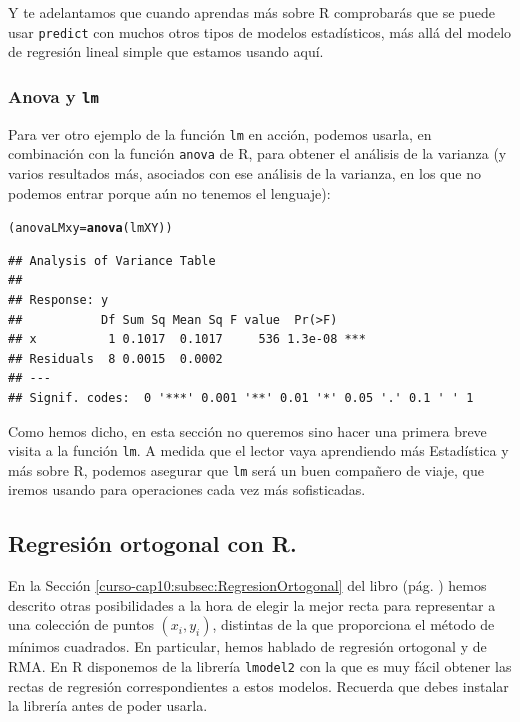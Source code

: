 \documentclass[10pt,a4paper]{article}\usepackage[]{graphicx}\usepackage[]{color}
\makeatletter
\newcommand{\hlstd}[1]{\textcolor[rgb]{0.345,0.345,0.345}{#1}}%
\newcommand{\hlkwb}[1]{\textcolor[rgb]{0.69,0.353,0.396}{#1}}%
\newcommand{\hlkwd}[1]{\textcolor[rgb]{0.737,0.353,0.396}{\textbf{#1}}}%
\newenvironment{kframe}{%
 \def\at@end@of@kframe{}%
 \ifinner\ifhmode%
  \def\at@end@of@kframe{\end{minipage}}%
  \begin{minipage}{\columnwidth}%
 \fi\fi%
 \def\FrameCommand##1{\hskip\@totalleftmargin \hskip-\fboxsep
 \colorbox{shadecolor}{##1}\hskip-\fboxsep
     \hskip-\linewidth \hskip-\@totalleftmargin \hskip\columnwidth}%
 \MakeFramed {\advance\hsize-\width
   \@totalleftmargin\z@ \linewidth\hsize
   \@setminipage}}%
 {\par\unskip\endMakeFramed%
 \at@end@of@kframe}
\newenvironment{knitrout}{}{} %
\makeatother
\begin{document}
Y te adelantamos que cuando aprendas más sobre R comprobarás que se puede usar {\tt predict} con muchos otros tipos de modelos estadísticos, más allá del modelo de regresión lineal simple que estamos usando aquí.

\subsubsection*{Anova y {\tt lm}}


Para ver otro ejemplo de la función {\tt lm} en acción, podemos usarla, en combinación con la función {\tt anova} de R, para obtener el análisis de la varianza (y varios resultados más, asociados con ese análisis de la varianza, en los que no podemos entrar porque aún no tenemos el lenguaje):

\begin{knitrout}
\color{fgcolor}\begin{kframe}
\begin{alltt}
\hlstd{(anovaLMxy} \hlkwb{=} \hlkwd{anova}\hlstd{(lmXY))}
\end{alltt}
\begin{verbatim}
## Analysis of Variance Table
## 
## Response: y
##           Df Sum Sq Mean Sq F value  Pr(>F)    
## x          1 0.1017  0.1017     536 1.3e-08 ***
## Residuals  8 0.0015  0.0002                    
## ---
## Signif. codes:  0 '***' 0.001 '**' 0.01 '*' 0.05 '.' 0.1 ' ' 1
\end{verbatim}
\end{kframe}
\end{knitrout}

Como hemos dicho, en esta sección no queremos sino hacer una primera breve visita a la función {\tt lm}. A medida que el lector vaya aprendiendo más Estadística y más sobre R, podemos asegurar que {\tt lm} será un buen compañero de viaje, que iremos usando para operaciones cada vez más sofisticadas.

\subsection{Regresión ortogonal con R.}
En la Sección \ref{curso-cap10:subsec:RegresionOrtogonal} del libro (pág. \pageref{curso-cap10:subsec:RegresionOrtogonal}) hemos descrito otras posibilidades a la hora de elegir la mejor recta para representar a una colección de puntos $(x_i, y_i)$, distintas de la que proporciona el método de mínimos cuadrados. En particular, hemos hablado de regresión ortogonal y de RMA. En R disponemos de la librería {\tt lmodel2} con la que es muy fácil obtener las rectas de regresión correspondientes a estos modelos. Recuerda que debes instalar la librería antes de poder usarla.
\end{document}
